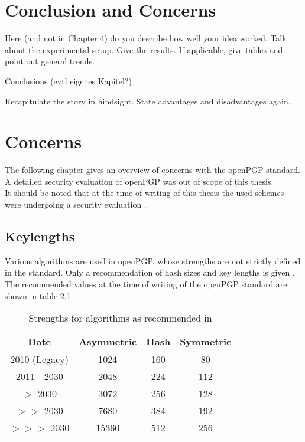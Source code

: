 \chapter{Conclusion and Concerns}

Here (and not in Chapter 4) do you describe how well your idea
worked. Talk about the experimental setup. Give the results. If
applicable, give tables and point out general trends.

Conclusions (evtl eigenes Kapitel?)

Recapitulate the story in hindsight. State advantages and
disadvantages again.

\chapter{Concerns}


The following chapter gives an overview of concerns with the openPGP standard.
A detailed security evaluation of openPGP was out of scope of this thesis. \\

It should be noted that at the time of writing of this thesis the used schemes were undergoing a security evaluation \citep{TUB2015}.

\section{Keylengths}

Various algorithms are used in openPGP, whose strengths are not strictly defined in the standard. 
Only a recommendation of hash sizes and key lengths is given \citep[section 14]{RFC4880}.
The recommended values at the time of writing of the openPGP standard are shown in table \ref{tab:keylengths}.

\begin{table}[h]
	\centering
	\begin{tabular}{|c|c|c|c|}
		\hline Date & 			Asymmetric & Hash & Symmetric \\ 
		\hline\hline 2010 (Legacy) & 1024 & 160 & 80 \\ 
		\hline 2011 - 2030 & 2048 & 224 & 112 \\ 
		\hline $>$ 2030 		   & 3072 & 256 & 128 \\ 
		\hline $>>$ 2030       & 7680 & 384 & 192 \\ 
		\hline $>>>$ 2030     & 15360 & 512 & 256 \\ 
		\hline 
	\end{tabular}
	\label{tab:keylengths}
	\caption{Strengths for algorithms as recommended in \citep[section 14]{RFC4880}} 
\end{table}


